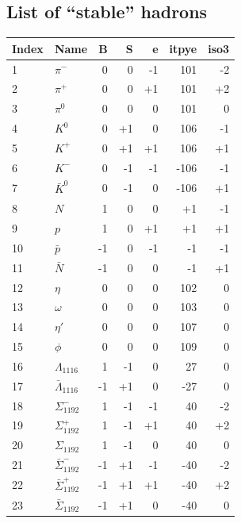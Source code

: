 \documentclass[12pt, a4paper]{article}
\begin{document}
\subsection{List of ``stable'' hadrons}\label{hadron_list}
\begin{small}
\begin{center}
	\begin{tabular}{|l | l | r | r | r | r | r |} 
		\hline
		Index & Name & B & S & e & itpye & iso3\\  
		\hline
	    1 & $\pi^-$ & 0 & 0 & -1 & 101 & -2\\
	    2 & $\pi^+$ & 0 & 0 & +1 & 101 & +2\\
	    3 & $\pi^0$ & 0 & 0 &  0 & 101 &  0\\
	    4 & $K^0$   & 0 & +1&  0 & 106 & -1\\
	    5 & $K^+$   & 0 & +1&  +1 & 106 & +1\\
	    6 & $K^-$   & 0 & -1&  -1 & -106 & -1\\
	    7 & $\bar{K}^0$ & 0 & -1&  0 & -106 & +1\\
	    8 & $N$ & 1 & 0 &  0 & +1 & -1\\
	    9 & $p$ & 1 & 0 &  +1 & +1 & +1\\
	    10 & $\bar{p}$ & -1 & 0 &  -1 & -1 & -1\\
        11 & $\bar{N}$ & -1 & 0 &  0 & -1 & +1\\
        12 & $\eta$     &  0 & 0 &  0 & 102& 0\\
        13 & $\omega$   &  0 & 0 &  0 & 103& 0\\
        14 & $\eta'$    &  0 & 0 &  0 & 107& 0\\
        15 & $\phi$     &  0 & 0 &  0 & 109& 0\\
        16 & $\Lambda_{1116}$ &  1 & -1 &  0 & 27& 0\\
        17 & $\bar{\Lambda}_{1116}$ &  -1 & +1 &  0 & -27& 0\\
        18 & $\Sigma_{1192}^-$ &  1 & -1 &  -1 & 40& -2\\
        19 & $\Sigma_{1192}^+$ &  1 & -1 &  +1 & 40& +2\\
        20 & $\Sigma_{1192}$   &  1 & -1 &   0 & 40&  0\\
        21 & $\bar{\Sigma}_{1192}^-$  &  -1 & +1 &  -1 & -40&  -2\\
        22 & $\bar{\Sigma}_{1192}^+$  &  -1 & +1 &  +1 & -40&  +2\\
        23 & $\bar{\Sigma}_{1192}$  &  -1 & +1 &  0 & -40&  0\\

\end{tabular}
\end{center}
\end{small}
\end{document}
